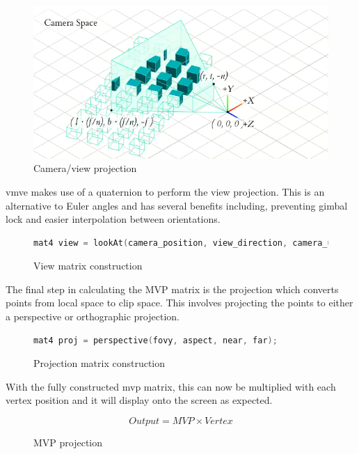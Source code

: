 \documentclass[11pt]{article}
\begin{document}
\begin{figure}[H]
  \centering
  \includegraphics[width=\textwidth]{images/camera_space.png}
  \caption{Camera/view projection \cite{camera_projection}}
  \label{fig:camera_projection} 
\end{figure}

\gls*{vmve} makes use of a quaternion to perform the view projection. This is an
alternative to Euler angles and has several benefits including, preventing gimbal
lock and easier interpolation between orientations.
\begin{figure}[H]
  \centering
  \begin{lstlisting}[language=C++]
    mat4 view = lookAt(camera_position, view_direction, camera_up);
  \end{lstlisting}
  \caption{View matrix construction}
  \label{fig:world_to_view}
\end{figure}


The final step in calculating the MVP matrix is the projection which converts
points from local space to clip space. This involves projecting the points to
either a perspective or orthographic projection.
\begin{figure}[H]
  \centering
  \begin{lstlisting}[language=C++]
    mat4 proj = perspective(fovy, aspect, near, far);
  \end{lstlisting}
  \caption{Projection matrix construction}
  \label{fig:local_to_projection}
\end{figure}

With the fully constructed mvp matrix, this can now be multiplied with each
vertex position and it will display onto the screen as expected.
\begin{figure}[H]
  \centering  
  \begin{equation}
    Output = MVP \times Vertex
  \end{equation}
  \caption{MVP projection}
  \label{fig:mvp_projection}
\end{figure}
\end{document}
